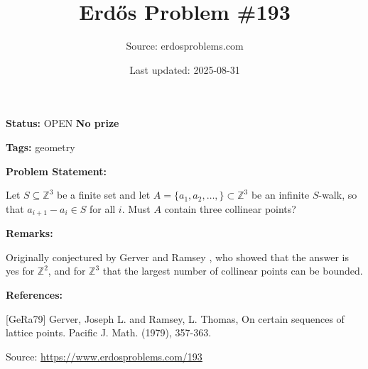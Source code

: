 \documentclass{article}
\title{Erd\H{o}s Problem \#193}
\date{Last updated: 2025-08-31}
\author{Source: erdosproblems.com}
\begin{document}
\maketitle

\noindent\textbf{Status:} OPEN \quad \textbf{No prize}

\noindent\textbf{Tags:} geometry

\medskip
\noindent\textbf{Problem Statement:}

Let $S\subseteq \mathbb{Z}^3$ be a finite set and let $A=\{a_1,a_2,\ldots,\}\subset \mathbb{Z}^3$ be an infinite $S$-walk, so that $a_{i+1}-a_i\in S$ for all $i$. Must $A$ contain three collinear points?

\bigskip
\noindent\textbf{Remarks:}

Originally conjectured by Gerver and Ramsey \cite{GeRa79}, who showed that the answer is yes for $\mathbb{Z}^2$, and for $\mathbb{Z}^3$ that the largest number of collinear points can be bounded.

\bigskip
\noindent\textbf{References:}

[GeRa79] Gerver, Joseph L. and Ramsey, L. Thomas, On certain sequences of lattice points. Pacific J. Math. (1979), 357-363.

\bigskip
\noindent\small{Source: \url{https://www.erdosproblems.com/193}}
\end{document}

